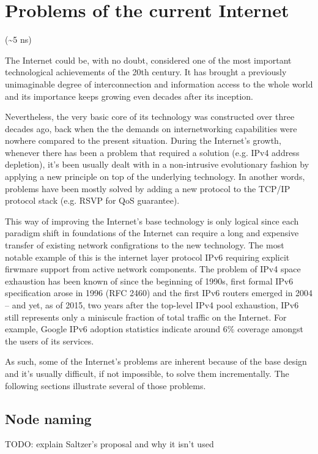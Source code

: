 \chapter{Problems of the current Internet}
    (\textasciitilde5 ns)

    The Internet could be, with no doubt, considered one of the most important technological achievements of the 20th century. It has brought a previously unimaginable degree of interconnection and information access to the whole world and its importance keeps growing even decades after its inception.

    Nevertheless, the very basic core of its technology was constructed over three decades ago, back when the the demands on internetworking capabilities were nowhere compared to the present situation. During the Internet's growth, whenever there has been a problem that required a solution (e.g. IPv4 address depletion), it's been usually dealt with in a non-intrusive evolutionary fashion by applying a new principle on top of the underlying technology. In another words, problems have been mostly solved by adding a new protocol to the TCP/IP protocol stack (e.g. RSVP for QoS guarantee).

    This way of improving the Internet's base technology is only logical since each paradigm shift in foundations of the Internet can require a long and expensive transfer of existing network configrations to the new technology. The most notable example of this is the internet layer protocol IPv6 requiring explicit firwmare support from active network components. The problem of IPv4 space exhaustion has been known of since the beginning of 1990s, first formal IPv6 specification arose in 1996 (RFC 2460) and the first IPv6 routers emerged in 2004 -- and yet, as of 2015, two years after the top-level IPv4 pool exhaustion, IPv6 still represents only a miniscule fraction of total traffic on the Internet. For example, Google IPv6 adoption statistics indicate around 6\% coverage amongst the users of its services.

    As such, some of the Internet's problems are inherent because of the base design and it's usually difficult, if not impossible, to solve them incrementally. The following sections illustrate several of those problems.

    \section{Node naming}

        TODO: explain Saltzer's proposal and why it isn't used

